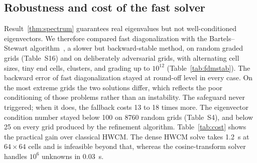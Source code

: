\documentclass[preprint,12pt]{elsarticle}
\theoremstyle{remark}
\begin{document}
\subsection{Robustness and cost of the fast solver}\label{sec:robust}
Result~\ref{thm:spectrum} guarantees real eigenvalues but not well-conditioned eigenvectors. We therefore
compared fast diagonalization with the Bartels--Stewart algorithm~\cite{bartels1972solution}, a slower but
backward-stable method, on random graded grids (Table~S16) and on deliberately adversarial grids, with
alternating cell sizes, tiny end cells, clusters, and grading up to $10^{12}$ (Table~\ref{tab:fdmstab}).
The backward error of fast diagonalization stayed at round-off level in every case. On the most extreme
grids the two solutions differ, which reflects the poor conditioning of those problems rather than an
instability. The safeguard never triggered; when it does, the fallback costs 13 to 18 times more. The eigenvector condition number
stayed below 100 on 8760 random grids (Table~S4), and below 25 on every grid produced by the refinement
algorithm. Table~\ref{tab:cost} shows the practical gain over classical HWCM. The dense HWCM solve takes
1.2~s at $64\times64$ cells and is infeasible beyond that, whereas the cosine-transform solver handles
$10^6$ unknowns in 0.03~s.

\begin{table}[t]\centering\small
\caption{Adversarial grid families ($N=256$): eigenvector conditioning, backward errors of fast
diagonalization (FDM) and Bartels--Stewart (B--S), and relative difference of the two solutions.}\label{tab:fdmstab}

\end{table}
\begin{table}[t]\centering\small
\caption{Wall time in seconds of one solve with $N^2$ unknowns (one CPU core). ``Dense'' is the classical
HWCM approach.}\label{tab:cost}

\end{table}
\end{document}
